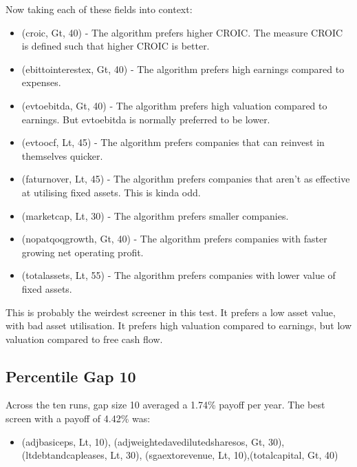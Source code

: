 Now taking each of these fields into context:
\begin{itemize}
    \item (croic, Gt, 40) - The algorithm prefers higher CROIC. The measure CROIC is defined such that higher CROIC is better.
    \item (ebittointerestex, Gt, 40) - The algorithm prefers high earnings compared to expenses.
    \item (evtoebitda, Gt, 40) - The algorithm prefers high valuation compared to earnings. But evtoebitda is normally preferred to be lower.
    \item (evtoocf, Lt, 45) - The algorithm prefers companies that can reinvest in themselves quicker.
    \item (faturnover, Lt, 45) - The algorithm prefers companies that aren't as effective at utilising fixed assets. This is kinda odd.
    \item (marketcap, Lt, 30) - The algorithm prefers smaller companies.
    \item (nopatqoqgrowth, Gt, 40) - The algorithm prefers companies with faster growing net operating profit.
    \item (totalassets, Lt, 55) - The algorithm prefers companies with lower value of fixed assets.
\end{itemize}

This is probably the weirdest screener in this test. It prefers a low asset value, with bad asset utilisation. It prefers high valuation compared to earnings, but low valuation compared to free cash flow.

\subsection{Percentile Gap 10}
Across the ten runs, gap size 10 averaged a 1.74\% payoff per year. The best screen with a payoff of 4.42\% was:

\begin{itemize}
    \item (adjbasiceps, Lt, 10), (adjweightedavedilutedsharesos, Gt, 30), \newline (ltdebtandcapleases, Lt, 30), (sgaextorevenue, Lt, 10),\newline (totalcapital, Gt, 40)
\end{itemize}

